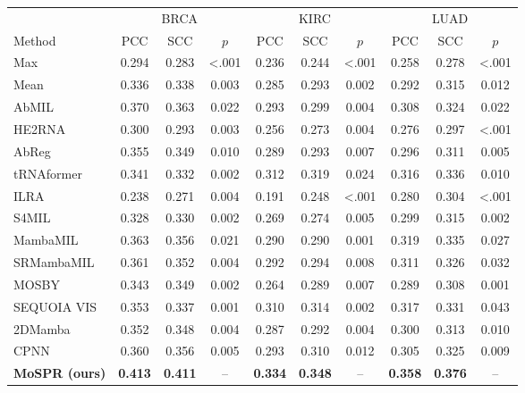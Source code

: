 \begin{tabular}{lccccccccc}
\toprule
& \multicolumn{3}{c}{BRCA} & \multicolumn{3}{c}{KIRC} & \multicolumn{3}{c}{LUAD}\\
\cmidrule(lr){2-4}\cmidrule(lr){5-7}\cmidrule(lr){8-10}
Method & PCC & SCC & $p$ & PCC & SCC & $p$ & PCC & SCC & $p$\\
\midrule
Max~\citep{wang2018revisiting} & 0.294 & 0.283 & \textless.001 & 0.236 & 0.244 & \textless.001 & 0.258 & 0.278 & \textless.001\\
Mean~\citep{wang2018revisiting} & 0.336 & 0.338 & 0.003 & 0.285 & 0.293 & 0.002 & 0.292 & 0.315 & 0.012\\
AbMIL~\citep{ilse2018abmil} & 0.370 & 0.363 & 0.022 & 0.293 & 0.299 & 0.004 & 0.308 & 0.324 & 0.022\\
HE2RNA~\citep{schmauch2020he2rna} & 0.300 & 0.293 & 0.003 & 0.256 & 0.273 & 0.004 & 0.276 & 0.297 & \textless.001\\
AbReg~\citep{graziani2022abreg} & 0.355 & 0.349 & 0.010 & 0.289 & 0.293 & 0.007 & 0.296 & 0.311 & 0.005\\
tRNAformer~\citep{alsaafin2022trnaformer} & 0.341 & 0.332 & 0.002 & 0.312 & 0.319 & 0.024 & 0.316 & 0.336 & 0.010\\
ILRA~\citep{xiang2023ilra} & 0.238 & 0.271 & 0.004 & 0.191 & 0.248 & \textless.001 & 0.280 & 0.304 & \textless.001\\
S4MIL~\citep{fillioux2023s4mil} & 0.328 & 0.330 & 0.002 & 0.269 & 0.274 & 0.005 & 0.299 & 0.315 & 0.002\\
MambaMIL~\citep{yang2024mambamil} & 0.363 & 0.356 & 0.021 & 0.290 & 0.290 & 0.001 & 0.319 & 0.335 & 0.027\\
SRMambaMIL~\citep{yang2024mambamil} & 0.361 & 0.352 & 0.004 & 0.292 & 0.294 & 0.008 & 0.311 & 0.326 & 0.032\\
MOSBY~\citep{senbabaoglu2024mosby} & 0.343 & 0.349 & 0.002 & 0.264 & 0.289 & 0.007 & 0.289 & 0.308 & 0.001\\
SEQUOIA VIS~\citep{pizurica2024sequoia} & 0.353 & 0.337 & 0.001 & 0.310 & 0.314 & 0.002 & 0.317 & 0.331 & 0.043\\
2DMamba~\citep{zhang2025twodmamba} & 0.352 & 0.348 & 0.004 & 0.287 & 0.292 & 0.004 & 0.300 & 0.313 & 0.010\\
CPNN~\citep{nishimura2026cpnn} & 0.360 & 0.356 & 0.005 & 0.293 & 0.310 & 0.012 & 0.305 & 0.325 & 0.009\\
\midrule
\textbf{MoSPR (ours)} & \textbf{0.413} & \textbf{0.411} & -- & \textbf{0.334} & \textbf{0.348} & -- & \textbf{0.358} & \textbf{0.376} & --\\
\bottomrule
\end{tabular}